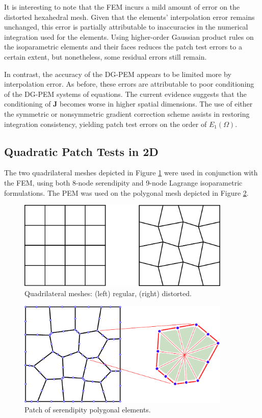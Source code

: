 It is interesting to note that the FEM incurs a mild amount of error on the distorted hexahedral mesh. Given that the elements' interpolation error remains unchanged, this error is partially attributable to inaccuracies in the numerical integration used for the elements. Using higher-order Gaussian product rules on the isoparametric elements and their faces reduces the patch test errors to a certain extent, but nonetheless, some residual errors still remain.

In contrast, the accuracy of the DG-PEM appears to be limited more by interpolation error. As before, these errors are attributable to poor conditioning of the DG-PEM systems of equations. The current evidence suggests that the conditioning of $\mathbf{J}$ becomes worse in higher spatial dimensions. The use of either the symmetric or nonsymmetric gradient correction scheme assists in restoring integration consistency, yielding patch test errors on the order of $E_1 (\Omega)$.

\subsection*{Quadratic Patch Tests in 2D}

The two quadrilateral meshes depicted in Figure \ref{fig:quadrilateral_patch_meshes} were used in conjunction with the FEM, using both 8-node serendipity and 9-node Lagrange isoparametric formulations. The PEM was used on the polygonal mesh depicted in Figure \ref{fig:quadratic_polygonal_patch_mesh}.

\begin{figure}[!h]
    \centering
    \includegraphics[width=4.0in]{figures/quadrilateral_patch_meshes.pdf}
    	\caption{Quadrilateral meshes: (left) regular, (right) distorted.}
    \label{fig:quadrilateral_patch_meshes}
\end{figure}

\begin{figure}[!h]
    \centering
    \includegraphics[width=4.0in]{figures/quadratic_polygonal_patch_mesh.pdf}
    	\caption{Patch of serendipity polygonal elements.}
    \label{fig:quadratic_polygonal_patch_mesh}
\end{figure}


